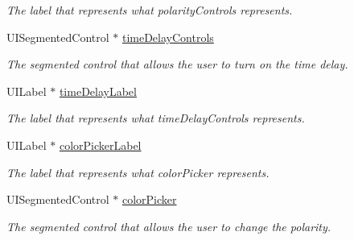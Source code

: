 \begin{DoxyCompactItemize}
\begin{DoxyCompactList}\small\item\em The label that represents what polarity\-Controls represents. \end{DoxyCompactList}\item 
\hypertarget{interface_causal_link_edit_menu_view_ac946d255eefec0ce4de0fa405900e209}{U\-I\-Segmented\-Control $\ast$ \hyperlink{interface_causal_link_edit_menu_view_ac946d255eefec0ce4de0fa405900e209}{time\-Delay\-Controls}}\label{interface_causal_link_edit_menu_view_ac946d255eefec0ce4de0fa405900e209}

\begin{DoxyCompactList}\small\item\em The segmented control that allows the user to turn on the time delay. \end{DoxyCompactList}\item 
\hypertarget{interface_causal_link_edit_menu_view_a14a3cab7d4f306f368b8707350970405}{U\-I\-Label $\ast$ \hyperlink{interface_causal_link_edit_menu_view_a14a3cab7d4f306f368b8707350970405}{time\-Delay\-Label}}\label{interface_causal_link_edit_menu_view_a14a3cab7d4f306f368b8707350970405}

\begin{DoxyCompactList}\small\item\em The label that represents what time\-Delay\-Controls represents. \end{DoxyCompactList}\item 
\hypertarget{interface_causal_link_edit_menu_view_a7e936d3c7aed4d5661f4f3e39b62c3b9}{U\-I\-Label $\ast$ \hyperlink{interface_causal_link_edit_menu_view_a7e936d3c7aed4d5661f4f3e39b62c3b9}{color\-Picker\-Label}}\label{interface_causal_link_edit_menu_view_a7e936d3c7aed4d5661f4f3e39b62c3b9}

\begin{DoxyCompactList}\small\item\em The label that represents what color\-Picker represents. \end{DoxyCompactList}\item 
\hypertarget{interface_causal_link_edit_menu_view_ac51c7f33f6b3c383f52b0b5958a7d05e}{U\-I\-Segmented\-Control $\ast$ \hyperlink{interface_causal_link_edit_menu_view_ac51c7f33f6b3c383f52b0b5958a7d05e}{color\-Picker}}\label{interface_causal_link_edit_menu_view_ac51c7f33f6b3c383f52b0b5958a7d05e}

\begin{DoxyCompactList}\small\item\em The segmented control that allows the user to change the polarity. \end{DoxyCompactList}\end{DoxyCompactItemize}


